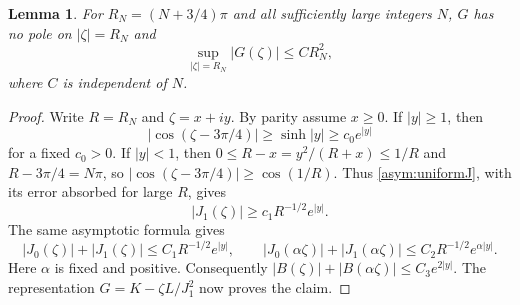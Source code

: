 \documentclass[11pt,letterpaper,reqno]{amsart}
\newtheorem{lemma}[theorem]{Lemma}
\theoremstyle{definition}
\begin{document}
\begin{lemma}\label{asym:circles}
For $R_N=(N+3/4)\pi$ and all sufficiently large integers $N$,
$G$ has no pole on $|\zeta|=R_N$ and
\[
 \sup_{|\zeta|=R_N}|G(\zeta)|\le C R_N^2,
\]
where $C$ is independent of $N$.
\end{lemma}
\begin{proof}
Write $R=R_N$ and $\zeta=x+iy$. By parity assume $x\ge0$.
If $|y|\ge1$, then
\[
 |\cos(\zeta-3\pi/4)|\ge\sinh|y|\ge c_0 e^{|y|}
\]
for a fixed $c_0>0$. If $|y|<1$, then
$0\le R-x=y^2/(R+x)\le1/R$ and $R-3\pi/4=N\pi$, so
$|\cos(\zeta-3\pi/4)|\ge\cos(1/R)$.
Thus \eqref{asym:uniformJ}, with its error absorbed for large $R$, gives
\[
 |J_1(\zeta)|\ge c_1R^{-1/2}e^{|y|}.
\]
The same asymptotic formula gives
\[
 |J_0(\zeta)|+|J_1(\zeta)|\le C_1R^{-1/2}e^{|y|},\qquad
 |J_0(\alpha\zeta)|+|J_1(\alpha\zeta)|
       \le C_2R^{-1/2}e^{\alpha|y|}.
\]
Here $\alpha$ is fixed and positive. Consequently
$|B(\zeta)|+|B(\alpha\zeta)|\le C_3e^{2|y|}$.
The representation $G=K-\zeta L/J_1^2$ now proves the claim.
\end{proof}
\end{document}
